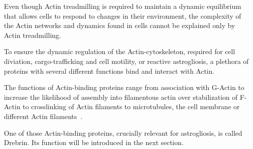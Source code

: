 \documentclass[a4paper,11pt,bibtotocnumbered]{article}
\begin{document}
Even though Actin treadmilling is required to maintain a dynamic equilibrium that allows cells to respond to changes in their environment, the complexity of the Actin networks and dynamics found in cells cannot be explained only by Actin treadmilling.

To ensure the dynamic regulation of the Actin-cytoskeleton, required for cell diviation, cargo-trafficking and cell motility, or reactive astrogliosis, a plethora of proteins with several different functions bind and interact with Actin. 



The functions of Actin-binding proteins range from association with G-Actin to increase the likelihood of assembly into filamentous actin over stabilization of F-Actin to crosslinking of Actin filaments to microtubules, the cell membrane or different Actin filaments~\cite{Alberts2015}. 


One of those Actin-binding proteins, crucially relevant for astrogliosis, is called Drebrin. Its function will be introduced in the next section.  






\end{document}

